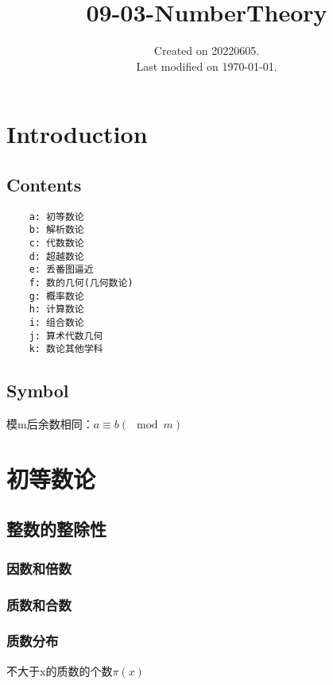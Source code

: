 \documentclass[UTF8]{../09-Mathematics}
\begin{document}
\title{09-03-NumberTheory}
\date{Created on 20220605.\\   Last modified on \today.}
\maketitle
\tableofcontents


\chapter{Introduction}

\section{Contents}

\begin{lstlisting}
    a: 初等数论
    b: 解析数论
    c: 代数数论
    d: 超越数论
    e: 丢番图逼近
    f: 数的几何(几何数论)
    g: 概率数论
    h: 计算数论
    i: 组合数论
    j: 算术代数几何
    k: 数论其他学科
\end{lstlisting}




\section{Symbol}

\begin{definition}
    模m后余数相同：$a \equiv b (\mod m)$
\end{definition}




\chapter{初等数论}

\section{整数的整除性}

\subsection{因数和倍数}

\subsection{质数和合数}

\subsection{质数分布}
不大于x的质数的个数$\pi(x)$
\end{document}

